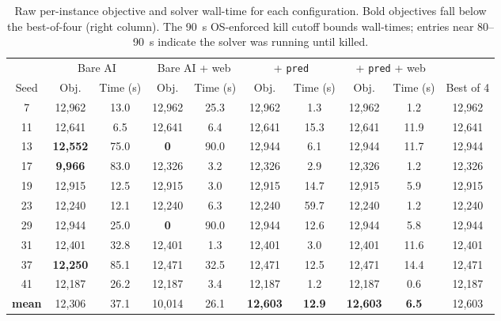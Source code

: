 \documentclass{article}
\begin{document}
\begin{table}[h]
\caption{Raw per-instance objective and solver wall-time for each configuration. Bold objectives fall below the best-of-four (right column). The 90~s OS-enforced kill cutoff bounds wall-times; entries near 80--90~s indicate the solver was running until killed.}
\label{tab:end-user-raw}
\centering
\footnotesize
\setlength{\tabcolsep}{4pt}
\begin{tabular}{@{}c cc cc cc cc c@{}}
\toprule
& \multicolumn{2}{c}{Bare AI} & \multicolumn{2}{c}{Bare AI + web} & \multicolumn{2}{c}{+ \texttt{pred}} & \multicolumn{2}{c}{+ \texttt{pred} + web} & \\
\cmidrule(lr){2-3} \cmidrule(lr){4-5} \cmidrule(lr){6-7} \cmidrule(lr){8-9}
Seed & Obj. & Time (s) & Obj. & Time (s) & Obj. & Time (s) & Obj. & Time (s) & Best of 4 \\
\midrule
 7 & 12{,}962          & 13.0 & 12{,}962          & 25.3 & 12{,}962 &  1.3 & 12{,}962 &  1.2 & 12{,}962 \\
11 & 12{,}641          &  6.5 & 12{,}641          &  6.4 & 12{,}641 & 15.3 & 12{,}641 & 11.9 & 12{,}641 \\
13 & \textbf{12{,}552} & 75.0 & \textbf{0}        & 90.0 & 12{,}944 &  6.1 & 12{,}944 & 11.7 & 12{,}944 \\
17 & \textbf{9{,}966}  & 83.0 & 12{,}326          &  3.2 & 12{,}326 &  2.9 & 12{,}326 &  1.2 & 12{,}326 \\
19 & 12{,}915          & 12.5 & 12{,}915          &  3.0 & 12{,}915 & 14.7 & 12{,}915 &  5.9 & 12{,}915 \\
23 & 12{,}240          & 12.1 & 12{,}240          &  6.3 & 12{,}240 & 59.7 & 12{,}240 &  1.2 & 12{,}240 \\
29 & 12{,}944          & 25.0 & \textbf{0}        & 90.0 & 12{,}944 & 12.6 & 12{,}944 &  5.8 & 12{,}944 \\
31 & 12{,}401          & 32.8 & 12{,}401          &  1.3 & 12{,}401 &  3.0 & 12{,}401 & 11.6 & 12{,}401 \\
37 & \textbf{12{,}250} & 85.1 & 12{,}471          & 32.5 & 12{,}471 & 12.5 & 12{,}471 & 14.4 & 12{,}471 \\
41 & 12{,}187          & 26.2 & 12{,}187          &  3.4 & 12{,}187 &  1.2 & 12{,}187 &  0.6 & 12{,}187 \\
\midrule
\textbf{mean} & 12{,}306 & 37.1 & 10{,}014 & 26.1 & \textbf{12{,}603} & \textbf{12.9} & \textbf{12{,}603} & \textbf{6.5} & 12{,}603 \\
\bottomrule
\end{tabular}
\end{table}
\end{document}
